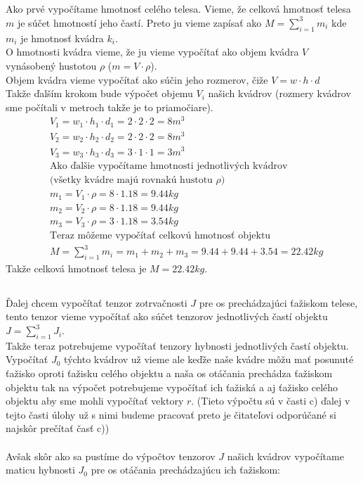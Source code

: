 \documentclass[a4paper]{article}
\begin{document}
	\subsection{}
	
	Ako prvé vypočítame hmotnosť celého telesa. Vieme, že celková hmotnosť telesa $m$ je súčet hmotností jeho častí. Preto ju vieme zapísať ako $M=\sum_{i=1}^{3}m_i$ kde $m_i$ je hmotnosť kvádra $k_i$.
	\\
	O hmotnosti kvádra vieme, že ju vieme vypočítať ako objem kvádra $V$ vynásobený hustotou $\rho$ ($m = V \cdot \rho$). 
	\\
	Objem kvádra vieme vypočítať ako súčin jeho rozmerov, čiže $V=w \cdot h \cdot d$
	\\
	Takže ďalším krokom bude výpočet objemu $V_i$ našich kvádrov (rozmery kvádrov sme počítali v metroch takže je to priamočiare). 
	\begin{align*}
		&V_1 = w_1 \cdot h_1 \cdot d_1 = 2 \cdot 2 \cdot 2 = 8 m^3 
		\\
		&V_2 = w_2 \cdot h_2 \cdot d_2 = 2 \cdot 2 \cdot 2 = 8 m^3 
		\\
		&V_3 = w_3 \cdot h_3 \cdot d_3 = 3 \cdot 1 \cdot 1 = 3 m^3
		\\
		&\text{Ako ďalšie vypočítame hmotnosti jednotlivých kvádrov}
		\\
		&\text{(všetky kvádre majú rovnakú hustotu $\rho$)} 
		\\
		&m_1 = V_1 \cdot \rho = 8 \cdot 1.18 = 9.44 kg
		\\
		&m_2 = V_2 \cdot \rho = 8 \cdot 1.18 = 9.44 kg
		\\
		&m_3 = V_3 \cdot \rho = 3 \cdot 1.18 = 3.54 kg
		\\
		&\text{Teraz môžeme vypočítať celkovú hmotnosť objektu}
		\\
		&M = \sum_{i=1}^{3} m_i = m_1 + m_2 + m_3 = 9.44 + 9.44 + 3.54 = 22.42 kg
	\end{align*}  
	Takže celková hmotnosť telesa je $M = 22.42 kg$.
	
	\subsection{}
	
	Ďalej chcem vypočítať tenzor zotrvačnosti $J$ pre os prechádzajúci ťažiskom telese, tento tenzor vieme vypočítať ako súčet tenzorov jednotlivých častí objektu $J = \sum_{i=1}^{3} J_i$.
	\\
	Takže teraz potrebujeme vypočítať tenzory hybnosti jednotlivých častí objektu. Vypočítať $J_0$ týchto kvádrov už vieme ale keďže naše kvádre môžu mať posunuté ťažisko oproti ťažisku celého objektu a naša os otáčania prechádza ťažiskom objektu tak na výpočet  potrebujeme vypočítať ich ťažiská a aj ťažisko celého objektu aby sme mohli vypočítať vektory $r$. (Tieto výpočtu sú v časti c) ďalej v tejto časti úlohy už s nimi budeme pracovať preto je čitateľovi odporúčané si najskôr prečítať časť c)) 
	\\
	\\
	Avšak skôr ako sa pustíme do výpočtov tenzorov $J$ našich kvádrov vypočítame maticu hybnosti $J_0$ pre os otáčania prechádzajúcu ich ťažiskom:
	
\end{document}
